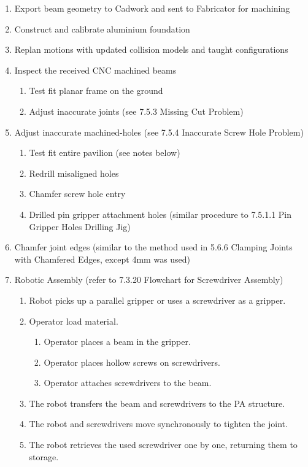 \begin{enumerate}
    \item Export beam geometry to Cadwork and sent to Fabricator for machining
    \item Construct and calibrate aluminium foundation
    \item Replan motions with updated collision models and taught configurations
    \item Inspect the received CNC machined beams
    \begin{enumerate}
        \item Test fit planar frame on the ground
        \item Adjust inaccurate joints  (see 7.5.3 Missing Cut Problem)
    \end{enumerate}
    \item Adjust inaccurate machined-holes (see 7.5.4 Inaccurate Screw Hole Problem)
    \begin{enumerate}
        \item Test fit entire pavilion (see notes below)
        \item Redrill misaligned holes
        \item Chamfer screw hole entry
        \item Drilled pin gripper attachment holes (similar procedure to 7.5.1.1 Pin Gripper Holes Drilling Jig)
    \end{enumerate}
    \item Chamfer joint edges (similar to the method used in 5.6.6 Clamping Joints with Chamfered Edges, except 4mm was used)
    \item Robotic Assembly (refer to 7.3.20 Flowchart for Screwdriver Assembly)
    \begin{enumerate}
        \item Robot picks up a parallel gripper or uses a screwdriver as a gripper.
        \item Operator load material.
        \begin{enumerate}
            \item Operator places a beam in the gripper.
            \item Operator places hollow screws on screwdrivers.
            \item Operator attaches screwdrivers to the beam.
        \end{enumerate}
        \item The robot transfers the beam and screwdrivers to the PA structure.
        \item The robot and screwdrivers move synchronously to tighten the joint.
        \item The robot retrieves the used screwdriver one by one, returning them to storage.
    \end{enumerate}
\end{enumerate}

